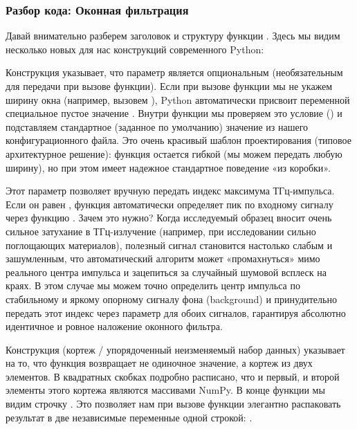 \subsubsection{Разбор кода: Оконная фильтрация}

Давай внимательно разберем заголовок и структуру функции . Здесь мы видим несколько новых для нас конструкций современного Python:
\begin{syntaxdesc}
    \item[Ширина по умолчанию \mycode{sigma_ps: float = None} (строка 7)] Конструкция  указывает, что параметр  является опциональным (необязательным для передачи при вызове функции). Если при вызове функции мы не укажем ширину окна (например, вызовем ), Python автоматически присвоит переменной  специальное пустое значение . Внутри функции мы проверяем это условие () и подставляем стандартное (заданное по умолчанию) значение из нашего конфигурационного файла. Это очень красивый шаблон проектирования (типовое архитектурное решение): функция остается гибкой (мы можем передать любую ширину), но при этом имеет надежное стандартное поведение «из коробки».
    
    \item[Положение пика по умолчанию \mycode{peak_idx: int = None} (строка 7)] Этот параметр позволяет вручную передать индекс максимума ТГц-импульса. Если он равен , функция автоматически определяет пик по входному сигналу  через функцию . Зачем это нужно? Когда исследуемый образец вносит очень сильное затухание в ТГц-излучение (например, при исследовании сильно поглощающих материалов), полезный сигнал становится настолько слабым и зашумленным, что автоматический алгоритм может «промахнуться» мимо реального центра импульса и зацепиться за случайный шумовой всплеск на краях. В этом случае мы можем точно определить центр импульса по стабильному и яркому опорному сигналу фона (background) и принудительно передать этот индекс через параметр  для обоих сигналов, гарантируя абсолютно идентичное и ровное наложение оконного фильтра.
    
    \item[Множественный возврат \mycode{-> tuple[np.ndarray, np.ndarray]} (строка 7)] Конструкция  (кортеж / упорядоченный неизменяемый набор данных) указывает на то, что функция возвращает не одиночное значение, а кортеж из двух элементов. В квадратных скобках  подробно расписано, что и первый, и второй элементы этого кортежа являются массивами NumPy. В конце функции мы видим строчку . Это позволяет нам при вызове функции элегантно распаковать результат в две независимые переменные одной строкой: .
\end{syntaxdesc}

